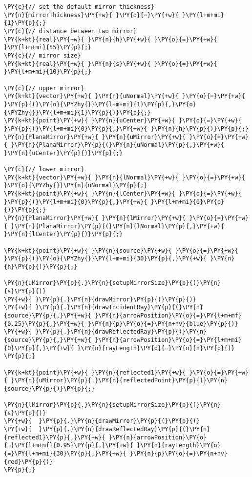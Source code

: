 \begin{Verbatim}[commandchars=\\\{\}]
\PY{c}{// set the default mirror thickness}
\PY{n}{mirrorThickness}\PY{+w}{ }\PY{o}{=}\PY{+w}{ }\PY{l+m+mi}{1}\PY{p}{;}
\PY{c}{// distance between two mirror}
\PY{k+kt}{real}\PY{+w}{ }\PY{n}{h}\PY{+w}{ }\PY{o}{=}\PY{+w}{ }\PY{l+m+mi}{55}\PY{p}{;}
\PY{c}{// mirror size}
\PY{k+kt}{real}\PY{+w}{ }\PY{n}{s}\PY{+w}{ }\PY{o}{=}\PY{+w}{ }\PY{l+m+mi}{10}\PY{p}{;}

\PY{c}{// upper mirror}
\PY{k+kt}{vector}\PY{+w}{ }\PY{n}{uNormal}\PY{+w}{ }\PY{o}{=}\PY{+w}{ }\PY{p}{(}\PY{o}{\PYZhy{}}\PY{l+m+mi}{1}\PY{p}{,}\PY{o}{\PYZhy{}}\PY{l+m+mi}{1}\PY{p}{)}\PY{p}{;}
\PY{k+kt}{point}\PY{+w}{ }\PY{n}{uCenter}\PY{+w}{ }\PY{o}{=}\PY{+w}{ }\PY{p}{(}\PY{l+m+mi}{0}\PY{p}{,}\PY{+w}{ }\PY{n}{h}\PY{p}{)}\PY{p}{;}
\PY{n}{PlanaMirror}\PY{+w}{ }\PY{n}{uMirror}\PY{+w}{ }\PY{o}{=}\PY{+w}{ }\PY{n}{PlanaMirror}\PY{p}{(}\PY{n}{uNormal}\PY{p}{,}\PY{+w}{ }\PY{n}{uCenter}\PY{p}{)}\PY{p}{;}

\PY{c}{// lower mirror}
\PY{k+kt}{vector}\PY{+w}{ }\PY{n}{lNormal}\PY{+w}{ }\PY{o}{=}\PY{+w}{ }\PY{o}{\PYZhy{}}\PY{n}{uNormal}\PY{p}{;}
\PY{k+kt}{point}\PY{+w}{ }\PY{n}{lCenter}\PY{+w}{ }\PY{o}{=}\PY{+w}{ }\PY{p}{(}\PY{l+m+mi}{0}\PY{p}{,}\PY{+w}{ }\PY{l+m+mi}{0}\PY{p}{)}\PY{p}{;}
\PY{n}{PlanaMirror}\PY{+w}{ }\PY{n}{lMirror}\PY{+w}{ }\PY{o}{=}\PY{+w}{ }\PY{n}{PlanaMirror}\PY{p}{(}\PY{n}{lNormal}\PY{p}{,}\PY{+w}{ }\PY{n}{lCenter}\PY{p}{)}\PY{p}{;}

\PY{k+kt}{point}\PY{+w}{ }\PY{n}{source}\PY{+w}{ }\PY{o}{=}\PY{+w}{ }\PY{p}{(}\PY{o}{\PYZhy{}}\PY{l+m+mi}{30}\PY{p}{,}\PY{+w}{ }\PY{n}{h}\PY{p}{)}\PY{p}{;}

\PY{n}{uMirror}\PY{p}{.}\PY{n}{setupMirrorSize}\PY{p}{(}\PY{n}{s}\PY{p}{)}
\PY{+w}{ }\PY{p}{.}\PY{n}{drawMirror}\PY{p}{(}\PY{p}{)}
\PY{+w}{ }\PY{p}{.}\PY{n}{drawIncidentRay}\PY{p}{(}\PY{n}{source}\PY{p}{,}\PY{+w}{ }\PY{n}{arrowPosition}\PY{o}{=}\PY{l+m+mf}{0.25}\PY{p}{,}\PY{+w}{ }\PY{n}{p}\PY{o}{=}\PY{n+nv}{blue}\PY{p}{)}
\PY{+w}{ }\PY{p}{.}\PY{n}{drawReflectedRay}\PY{p}{(}\PY{n}{source}\PY{p}{,}\PY{+w}{ }\PY{n}{arrowPosition}\PY{o}{=}\PY{l+m+mi}{0}\PY{p}{,}\PY{+w}{ }\PY{n}{rayLength}\PY{o}{=}\PY{n}{h}\PY{p}{)}
\PY{p}{;}

\PY{k+kt}{point}\PY{+w}{ }\PY{n}{reflected1}\PY{+w}{ }\PY{o}{=}\PY{+w}{ }\PY{n}{uMirror}\PY{p}{.}\PY{n}{reflectedPoint}\PY{p}{(}\PY{n}{source}\PY{p}{)}\PY{p}{;}

\PY{n}{lMirror}\PY{p}{.}\PY{n}{setupMirrorSize}\PY{p}{(}\PY{n}{s}\PY{p}{)}
\PY{+w}{  }\PY{p}{.}\PY{n}{drawMirror}\PY{p}{(}\PY{p}{)}
\PY{+w}{  }\PY{p}{.}\PY{n}{drawReflectedRay}\PY{p}{(}\PY{n}{reflected1}\PY{p}{,}\PY{+w}{ }\PY{n}{arrowPosition}\PY{o}{=}\PY{l+m+mf}{0.95}\PY{p}{,}\PY{+w}{ }\PY{n}{rayLength}\PY{o}{=}\PY{l+m+mi}{30}\PY{p}{,}\PY{+w}{ }\PY{n}{p}\PY{o}{=}\PY{n+nv}{red}\PY{p}{)}
\PY{p}{;}
\end{Verbatim}
